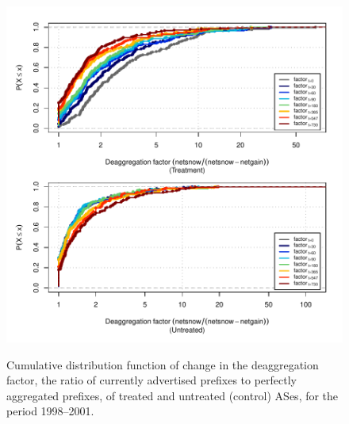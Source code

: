 \begin{figure}[H]
\begin{centering}
\begin{singlespace}
    \includegraphics[width=6in]
    {figures/behavior-deagg_factor-1998_2001-corr.pdf}
    \vspace{-2em}\\
    \caption{Cumulative distribution function of change in the deaggregation
    factor, the ratio of currently advertised prefixes to perfectly aggregated
    prefixes, of treated and untreated (control) ASes, for the period
    1998--2001.}
\end{singlespace}
\end{centering}
\end{figure}
